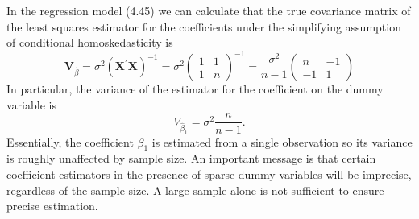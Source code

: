 \documentclass[10pt]{article}
\begin{document}
In the regression model (4.45) we can calculate that the true covariance matrix of the least squares estimator for the coefficients under the simplifying assumption of conditional homoskedasticity is
$$
\boldsymbol{V}_{\widehat{\beta}}=\sigma^{2}\left(\boldsymbol{X}^{\prime} \boldsymbol{X}\right)^{-1}=\sigma^{2}\left(\begin{array}{ll}
1 & 1 \\
1 & n
\end{array}\right)^{-1}=\frac{\sigma^{2}}{n-1}\left(\begin{array}{cc}
n & -1 \\
-1 & 1
\end{array}\right)
$$
In particular, the variance of the estimator for the coefficient on the dummy variable is
$$
V_{\widehat{\beta}_{1}}=\sigma^{2} \frac{n}{n-1} .
$$
Essentially, the coefficient $\beta_{1}$ is estimated from a single observation so its variance is roughly unaffected by sample size. An important message is that certain coefficient estimators in the presence of sparse dummy variables will be imprecise, regardless of the sample size. A large sample alone is not sufficient to ensure precise estimation.
\end{document}
